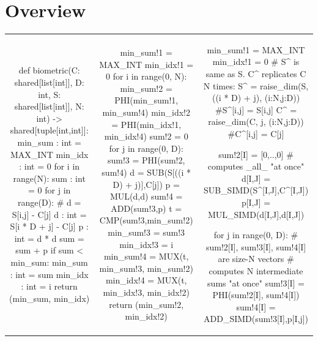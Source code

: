 \documentclass[sigconf, screen, natbib=false, dvipsnames, table]{acmart}
\theoremstyle{definition}
\begin{document}
\section{Overview}
\label{sec:overview}


\begin{table}
\begin{tabular}{ccc}
\begin{minipage}{0.275\textwidth}
{\small
\begin{pythonn}
def biometric(C: shared[list[int]], D: int, 
      S: shared[list[int]], N: int) -> 
      shared[tuple[int,int]]:
   min_sum : int = MAX_INT
   min_idx : int = 0  
   for i in range(N): 
      sum : int = 0
      for j in range(D): 
         # d = S[i,j] - C[j]
         d : int = S[i * D + j] - C[j] 
         p : int = d * d
         sum = sum + p
      if sum < min_sum:
         min_sum : int = sum
         min_idx : int = i
   return (min_sum, min_idx)
\end{pythonn}
}
\end{minipage}

&

\begin{minipage}{0.33\textwidth}
{\tiny
\begin{pythonn}
min_sum!1 = MAX_INT
min_idx!1 = 0
for i in range(0, N):
   min_sum!2 = PHI(min_sum!1, min_sum!4)
   min_idx!2 = PHI(min_idx!1, min_idx!4)
   sum!2 = 0
   for j in range(0, D):
      sum!3 = PHI(sum!2, sum!4)
      d = SUB(S[((i * D) + j)],C[j]) 
      p = MUL(d,d) 
      sum!4 = ADD(sum!3,p) 
   t = CMP(sum!3,min_sum!2) 
   min_sum!3 = sum!3
   min_idx!3 = i
   min_sum!4 = MUX(t, min_sum!3, min_sum!2) 
   min_idx!4 = MUX(t, min_idx!3, min_idx!2) 
return (min_sum!2, min_idx!2)   
\end{pythonn}
}
\end{minipage} 

&

\begin{minipage}{0.33\textwidth}
{\small
\begin{pythonn}
min_sum!1 = MAX_INT
min_idx!1 = 0
# S^ is same as S. C^ replicates C N times: 
S^ = raise_dim(S, ((i * D) + j), (i:N,j:D)) #S^[i,j] = S[i,j]
C^ = raise_dim(C, j, (i:N,j:D)) #C^[i,j] = C[j]

sum!2[I] = [0,..,0]
# computes _all_  "at once"
d[I,J] = SUB_SIMD(S^[I,J],C^[I,J])
p[I,J] = MUL_SIMD(d[I,J],d[I,J])

for j in range(0, D):
   # sum!2[I], sum!3[I], sum!4[I] are size-N vectors 
   # computes N intermediate sums "at once"
   sum!3[I] = PHI(sum!2[I], sum!4[I])       
   sum!4[I] = ADD_SIMD(sum!3[I],p[I,j])


\end{pythonn}}
\end{minipage}
\end{tabular}
\end{table}
\end{document}
